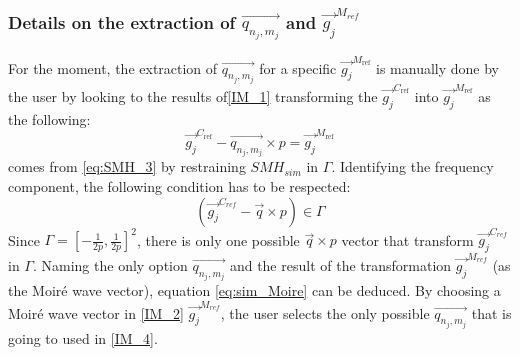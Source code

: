 \documentclass[12pt]{article}
\begin{document}
\subsubsection*[Extraction q and g]{Details on the extraction of $\overrightarrow{q_{n_j,m_j}}$ and $\overrightarrow{g_j}^{M_{ref}}$}

For the moment, the extraction of $\overrightarrow{q_{n_j,m_j}}$ for a specific $ \overrightarrow{g_j}^{M_{\text{ref}}}$ is manually done by the user by looking to the results of\cref{IM_1} transforming the $\overrightarrow{g_j}^{C_{\text{ref}}}$ into $\overrightarrow{g_j}^{M_{\text{ref}}}$ as the following:
\begin{equation}
\label{eq:sim_Moire}
{\overrightarrow{g_j}^{C_{\text{ref}}}}-\overrightarrow{q_{n_j,m_j}}\times p =  \overrightarrow{g_j}^{M_{\text{ref}}}
\end{equation}
 comes from \cref{eq:SMH_3} by restraining $SMH_{sim}$ in $\Gamma$. Identifying the frequency component, the following condition has to be respected:
\begin{equation*}
(\overrightarrow{g_j}^{C_{ref}}-\overrightarrow{q}\times p) \in \Gamma
\end{equation*}
Since $\Gamma = [-\frac{1}{2p},\frac{1}{2p}]^{2}$, there is only one possible $\overrightarrow{q}\times p$ vector that transform $\overrightarrow{g_j}^{C_{ref}}$ in $\Gamma$. Naming the only option $\overrightarrow{q_{n_j,m_j}}$ and the result of the transformation $\overrightarrow{g_j}^{M_{ref}}$ (as the Moir{\'e} wave vector), equation \cref{eq:sim_Moire} can be deduced. By choosing a Moir{\'e} wave vector in \cref{IM_2} $\overrightarrow{g_j}^{M_{ref}}$, the user selects the only possible $\overrightarrow{q_{n_j,m_j}}$ that is going to used in \cref{IM_4}.
\end{document}
